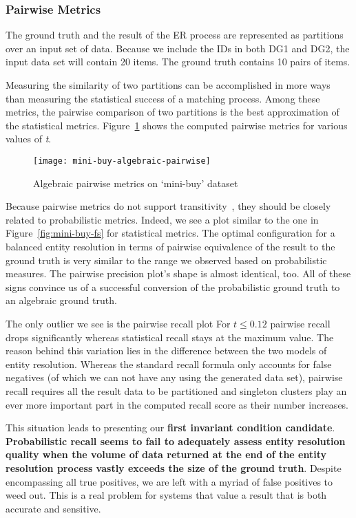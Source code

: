 \subsubsection{Pairwise Metrics}

The ground truth and the result of the ER process are represented as partitions
over an input set of data.
Because we include the IDs in both DG1 and DG2, the input data set will
contain 20 items.
The ground truth contains 10 pairs of items.

Measuring the similarity of two partitions can be accomplished in more ways than
measuring the statistical success of a matching process.
Among these metrics, the pairwise comparison of two partitions is the best
approximation of the statistical metrics\cite{Men10}.
Figure~\ref{fig:mini-alg-pairwise} shows the computed pairwise metrics for
various values of \textit{t}.

\begin{figure}[htbp]
    \centering
    \captionsetup{justification=centering}
    \texttt{[image: mini-buy-algebraic-pairwise]}
    \caption{Algebraic pairwise metrics on `mini-buy' dataset}\label{fig:mini-alg-pairwise}
\end{figure}

Because pairwise metrics do not support transitivity~\cite{Men10,hitesh2012},
they should be closely related to probabilistic metrics.
Indeed, we see a plot similar to the one in Figure~\ref{fig:mini-buy-fs} for statistical metrics.
The optimal configuration for a balanced entity resolution in terms of pairwise
equivalence of the result to the ground truth is very similar to the range we
observed based on probabilistic measures.
The pairwise precision plot's shape is almost identical, too.
All of these signs convince us of a successful conversion of the probabilistic
ground truth to an algebraic ground truth.

The only outlier we see is the pairwise recall plot
For $t \le 0.12$ pairwise recall drops significantly whereas statistical recall
stays at the maximum value.
The reason behind this variation lies in the difference between the two models
of entity resolution.
Whereas the standard recall formula only accounts for false negatives (of which
we can not have any using the generated data set), pairwise recall requires all
the result data to be partitioned and singleton clusters play an ever more
important part in the computed recall score as their number increases.

This situation leads to presenting our \textbf{first invariant condition
candidate}.
\textbf{Probabilistic recall seems to fail to adequately assess entity
resolution quality when the volume of data returned at the end of the entity
resolution process vastly exceeds the size of the ground truth}.
Despite encompassing all true positives, we are left with a myriad of false
positives to weed out.
This is a real problem for systems that value a result that is both accurate and
sensitive.

